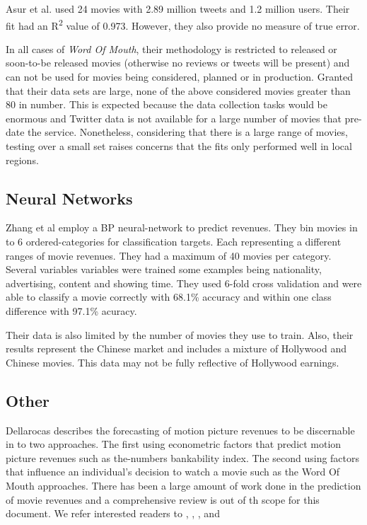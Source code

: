 \documentclass[conference]{IEEEtran}
\begin{document}
Asur et al. used 24 movies with 2.89 million tweets and 1.2 million users. Their fit 
had an R\textsuperscript{2} value of 0.973. However, they also provide no measure
of true error. 

In all cases of \textit{Word Of Mouth}, their methodology is restricted to released
or soon-to-be released movies (otherwise no reviews or tweets will be present) and 
can not be used for movies being considered, planned or in production. Granted that their 
data sets are large, none of the above considered movies greater than 80 in number. This is 
expected because the data collection tasks would be enormous and Twitter data is not available for 
a large number of movies that pre-date the service. Nonetheless, considering that there
is a large range of movies, testing over a small set raises concerns that the fits only 
performed well in local regions.

\subsection{Neural Networks}
Zhang et al\cite{zhang} employ a BP neural-network to predict revenues. They bin
movies in to 6 ordered-categories for classification targets. 
Each representing a different ranges of movie revenues. They
had a maximum of 40 movies per category. Several variables variables were trained
some examples being nationality, advertising, content and showing time. They used 
6-fold cross validation and were able to classify a movie correctly with 68.1\%
accuracy and within one class difference with 97.1\% acuracy. 

Their data is also limited by the number of movies they use to train. Also,
their results represent the Chinese market and includes a mixture of Hollywood
and Chinese movies. This data may not be fully reflective of Hollywood earnings. 

\subsection{Other}
Dellarocas \cite{dellarocas} describes the forecasting of motion picture 
revenues to be discernable in to two approaches. The first using 
econometric factors that predict motion picture revenues such 
as the-numbers bankability index. The second using factors that 
influence an individual's decision to watch a movie such as the 
Word Of Mouth approaches. There has been a large amount of work done 
in the prediction of movie revenues and a comprehensive review is out
of th scope for this document. We refer interested readers to \cite{litman-kohl},
\cite{el-el}, \cite{sawhey}, \cite{sochay} and \cite{}
\end{document}
